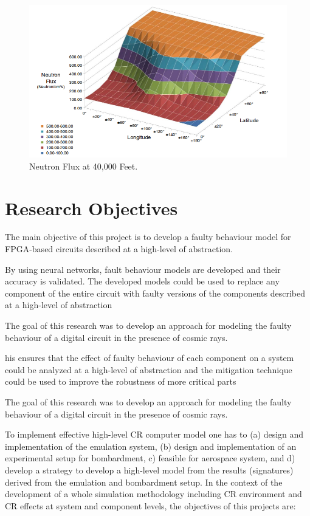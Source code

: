 \begin{figure}
 \centering
  \captionsetup{justification=centering}    
   \includegraphics[scale=0.4]{figures/img/neutron-flux.png}
   \caption{Neutron Flux at 40,000 Feet.}
\label{fig:neu-flux}
\end{figure}





\section{Research Objectives}



The main objective of this project is to develop a faulty behaviour model for FPGA-based
circuits described at a high-level of abstraction.

By using neural networks, fault behaviour
models are developed and their accuracy is validated. The developed models could be used to
replace any component of the entire circuit with faulty versions of the components described
at a high-level of abstraction

The
goal of this research was to develop an approach for modeling the faulty behaviour of a
digital circuit in the presence of cosmic rays.

his ensures that the effect of faulty behaviour of each
component on a system could be analyzed at a high-level of abstraction and the mitigation
technique could be used to improve the robustness of more critical parts


The
goal of this research was to develop an approach for modeling the faulty behaviour of a
digital circuit in the presence of cosmic rays.


To implement effective high-level CR computer model one has to (a) design and implementation of the emulation system, (b) design and implementation of an experimental setup for bombardment,  c) feasible for aerospace system, and d) develop  a strategy to develop a high-level model from the results (signatures) derived from the emulation and bombardment setup. In the context of the development of a whole simulation methodology including CR environment and CR effects at
system and component levels, the objectives of this projects are:

